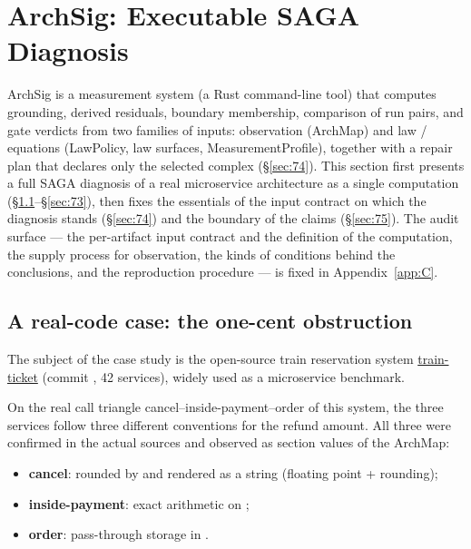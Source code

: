 \section{ArchSig: Executable SAGA Diagnosis}\label{sec:7}

ArchSig is a measurement system (a Rust command-line tool) that
computes grounding, derived residuals, boundary membership, comparison
of run pairs, and gate verdicts from two families of inputs:
observation (ArchMap) and law / equations (LawPolicy, law surfaces,
MeasurementProfile), together with a repair plan that declares only
the selected complex (\S\ref{sec:74}). This section first presents a full SAGA diagnosis
of a real microservice architecture as a single computation
(\S\ref{sec:71}--\S\ref{sec:73}), then fixes the essentials of the
input contract on which the diagnosis stands (\S\ref{sec:74}) and the
boundary of the claims (\S\ref{sec:75}). The audit surface --- the
per-artifact input contract and the definition of the computation, the
supply process for observation, the kinds of conditions behind the
conclusions, and the reproduction procedure --- is fixed in
Appendix~\ref{app:C}.

\subsection{A real-code case: the one-cent obstruction}\label{sec:71}

The subject of the case study is the open-source train reservation
system
\href{https://github.com/FudanSELab/train-ticket}{train-ticket}
(commit , 42 services), widely used as a
microservice benchmark.

On the real call triangle cancel--inside-payment--order of this
system, the three services follow three different conventions for the
refund amount. All three were confirmed in the actual sources and observed as
section values of the ArchMap:
{\sloppy
\begin{itemize}
\item \textbf{cancel}: \allowbreak{}
rounded by  and rendered as a string
(floating point + rounding);
\item \textbf{inside-payment}: exact arithmetic on
;
\item \textbf{order}: pass-through storage in
.
\end{itemize}
}

